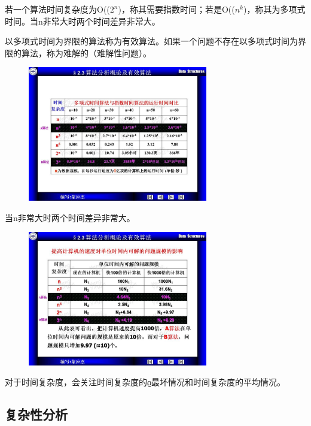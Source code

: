 \documentclass[AutoFakeBold]{LZUThesis2007}
\begin{document}
			若一个算法时间复杂度为O(($2^{n}$)，称其需要指数时间；若是O(($n^{k}$)，称其为多项式时间。当n非常大时两个时间差异非常大。

			以多项式时间为界限的算法称为有效算法。如果一个问题不存在以多项式时间为界限的算法，称为难解的（难解性问题）。

			\begin{figure}[H]
			    \centering
			    \includegraphics[width=0.7\textwidth]{figures/2.2.jpg}
			    
			    \label{fig_install_texlive}
			\end{figure}

			当n非常大时两个时间差异非常大。

			\begin{figure}[H]
			    \centering
			    \includegraphics[width=0.7\textwidth]{figures/2.3.jpg}
			    
			    \label{fig_install_texlive}
			\end{figure}

			对于时间复杂度，会关注时间复杂度的ϱ最坏情况和时间复杂度的平均情况。

		\subsection{复杂性分析}
\end{document}
